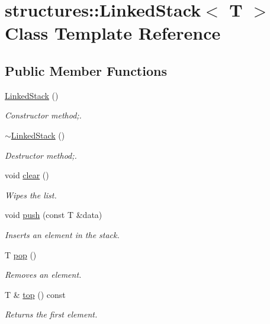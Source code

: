 \hypertarget{classstructures_1_1_linked_stack}{}\section{structures\+:\+:Linked\+Stack$<$ T $>$ Class Template Reference}
\label{classstructures_1_1_linked_stack}
\subsection*{Public Member Functions}
\begin{DoxyCompactItemize}
\item 
\mbox{\hyperlink{classstructures_1_1_linked_stack_a546b827cccaa49b4f470110bc3a9004e}{Linked\+Stack}} ()
\begin{DoxyCompactList}\small\item\em Constructor method;. \end{DoxyCompactList}\item 
\mbox{\hyperlink{classstructures_1_1_linked_stack_aae17566eb103c92eb22be2e779286f2f}{$\sim$\+Linked\+Stack}} ()
\begin{DoxyCompactList}\small\item\em Destructor method;. \end{DoxyCompactList}\item 
void \mbox{\hyperlink{classstructures_1_1_linked_stack_a56cc909b4a3a0ff7a589f35032ca0ba8}{clear}} ()
\begin{DoxyCompactList}\small\item\em Wipes the list. \end{DoxyCompactList}\item 
void \mbox{\hyperlink{classstructures_1_1_linked_stack_adb8c6b231298ac25b17ba692d510a3fc}{push}} (const T \&data)
\begin{DoxyCompactList}\small\item\em Inserts an element in the stack. \end{DoxyCompactList}\item 
T \mbox{\hyperlink{classstructures_1_1_linked_stack_a8ff0ba0de594ec26971bb259e1d28c3c}{pop}} ()
\begin{DoxyCompactList}\small\item\em Removes an element. \end{DoxyCompactList}\item 
T \& \mbox{\hyperlink{classstructures_1_1_linked_stack_a14ab6e3507dd1206a87bba8c57e1733f}{top}} () const
\begin{DoxyCompactList}\small\item\em Returns the first element. \end{DoxyCompactList}\item 

\end{DoxyCompactItemize}
